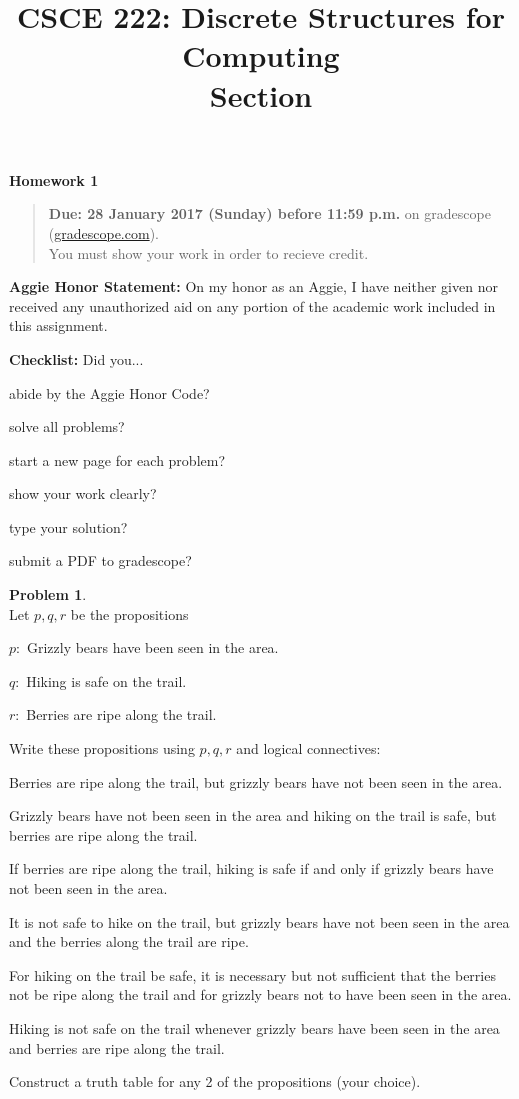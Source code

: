 \documentclass{article}
\title{CSCE 222: Discrete Structures for Computing\\Section \mysectionnumber\\\mysemester}
\author{\myname}
\date{}
\theoremstyle{definition}
\newtheorem{problem}{Problem}
\newcommand{\honor}{\noindent \textbf{Aggie Honor Statement: }On my honor as an Aggie, I have neither
  given nor received any unauthorized aid on any portion of the academic work included in this assignment.
}
\newcommand{\checklist}{\noindent\textbf{Checklist:}
Did you...
\begin{compactenum}
\item abide by the Aggie Honor Code?
\item solve all problems?
\item start a new page for each problem?
\item show your work clearly?
\item type your solution?
\item submit a PDF to gradescope?
\end{compactenum}
}
\newcommand{\problemset}[1]{\begin{center}\textbf{Homework #1}\end{center}}
\newcommand{\duedate}[1]{\begin{quote}\textbf{Due: #1} on gradescope (\url{gradescope.com}). \\You must show your work in order to recieve credit.\end{quote}}
\newcommand{\homeworknumber}[0]{1}
\begin{document}
\maketitle
\problemset{\homeworknumber}
\duedate{28 January 2017 (Sunday) before 11:59 p.m.}
\bigskip

\honor
\bigskip

\checklist

\begin{problem}\ \\
Let $p,q,r$ be the propositions
\begin{compactenum}
\item[$p:$] Grizzly bears have been seen in the area.
\item[$q:$] Hiking is safe on the trail.
\item[$r:$] Berries are ripe along the trail.
\end{compactenum}
Write these propositions using $p,q,r$ and logical connectives:
\begin{compactenum}
\item Berries are ripe along the trail, but grizzly bears have not been seen in the area.
\item Grizzly bears have not been seen in the area and hiking on the trail is safe, but berries are ripe along the trail.
\item If berries are ripe along the trail, hiking is safe if and only if grizzly bears have not been seen in the area.
\item It is not safe to hike on the trail, but grizzly bears have not been seen in the area and the berries along the trail are ripe.
\item For hiking on the trail be safe, it is necessary but not sufficient that the berries not be ripe along the trail and for grizzly bears not to have been seen in the area.
\item Hiking is not safe on the trail whenever grizzly bears have been seen in the area and berries are ripe along the trail.
\end{compactenum}
Construct a truth table for any 2 of the propositions (your choice).
\end{problem}
\end{document}

